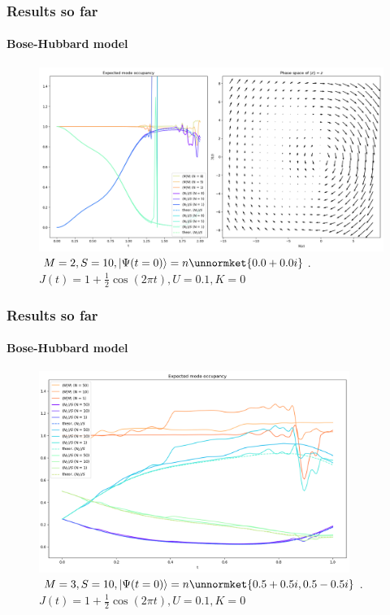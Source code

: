 \documentclass[english]{beamer}
\begin{document}
  \begin{frame}
  	\frametitle{Results so far}
  	\framesubtitle{Bose-Hubbard model}
  	\begin{figure}
	\centering
    		\includegraphics[width=1.0\textwidth]{images/BH_M=2_PS}
    		\caption{$M=2, S=10, \ket{\Psi(t=0)}=n\unnormket{0.0+0.0i}$. $J(t)=1+\frac{1}{2}\cos(2\pi t), U=0.1, K=0$}
    		\label{fig:BH2}
	\end{figure}
  \end{frame}
  
  \begin{frame}
  	\frametitle{Results so far}
  	\framesubtitle{Bose-Hubbard model}
  	\begin{figure}
	\centering
    		\includegraphics[width=0.9\textwidth]{images/BH_M=3}
    		\caption{$M=3, S=10, \ket{\Psi(t=0)}=n\unnormket{0.5+0.5i,0.5-0.5i}$. $J(t)=1+\frac{1}{2}\cos(2\pi t), U=0.1, K=0$}
    		\label{fig:BH3}
	\end{figure}
  \end{frame}
  
\end{document}
